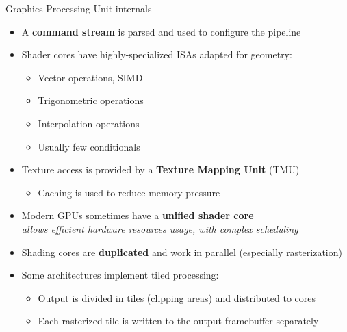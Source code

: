 \begin{frame}{Graphics Processing Unit internals}
  \begin{itemize}
  \item A \textbf{command stream} is parsed and used to configure the pipeline
  \item Shader cores have highly-specialized ISAs adapted for geometry:
  \begin{minipage}[b]{0.45\textwidth}
    \begin{itemize}
    \item Vector operations, SIMD
    \item Trigonometric operations
    \end{itemize}
  \end{minipage}
  \begin{minipage}[b]{0.45\textwidth}
    \begin{itemize}
    \item Interpolation operations
    \item Usually few conditionals
    \end{itemize}
  \end{minipage}
  \item Texture access is provided by a \textbf{Texture Mapping Unit} (TMU)
    \begin{itemize}
    \item Caching is used to reduce memory pressure
    \end{itemize}
  \item Modern GPUs sometimes have a \textbf{unified shader core}\\
    \textit{allows efficient hardware resources usage, with complex scheduling}
  \item Shading cores are \textbf{duplicated} and work in parallel (especially rasterization)
  \item Some architectures implement tiled processing:
    \begin{itemize}
    \item Output is divided in tiles (clipping areas) and distributed to cores
    \item Each rasterized tile is written to the output framebuffer separately
    \end{itemize}
  \end{itemize}
\end{frame}
